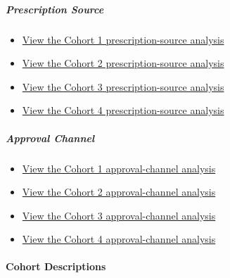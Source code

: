 \documentclass[
]{article}
\providecommand{\tightlist}{%
  \setlength{\itemsep}{0pt}\setlength{\parskip}{0pt}}
\begin{document}
\subparagraph{Prescription Source}\label{prescription-source}

\begin{itemize}
\tightlist
\item
  \href{../../charts/prescription-source-analysis/prescription-source-analysis-cohort-1.png}{View
  the Cohort 1 prescription-source analysis}
\item
  \href{../../charts/prescription-source-analysis/prescription-source-analysis-cohort-2.png}{View
  the Cohort 2 prescription-source analysis}
\item
  \href{../../charts/prescription-source-analysis/prescription-source-analysis-cohort-3.png}{View
  the Cohort 3 prescription-source analysis}
\item
  \href{../../charts/prescription-source-analysis/prescription-source-analysis-cohort-4.png}{View
  the Cohort 4 prescription-source analysis}
\end{itemize}

\subparagraph{Approval Channel}\label{approval-channel}

\begin{itemize}
\tightlist
\item
  \href{../../charts/approval-channel-analysis/approval-channel-analysis-cohort-1.png}{View
  the Cohort 1 approval-channel analysis}
\item
  \href{../../charts/approval-channel-analysis/approval-channel-analysis-cohort-2.png}{View
  the Cohort 2 approval-channel analysis}
\item
  \href{../../charts/approval-channel-analysis/approval-channel-analysis-cohort-3.png}{View
  the Cohort 3 approval-channel analysis}
\item
  \href{../../charts/approval-channel-analysis/approval-channel-analysis-cohort-4.png}{View
  the Cohort 4 approval-channel analysis}
\end{itemize}

\paragraph{Cohort Descriptions}\label{cohort-descriptions}
\end{document}
